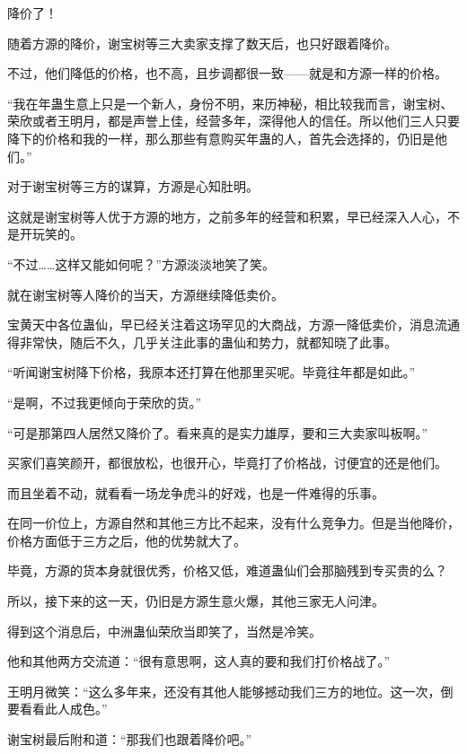 
\begin{this_body}



降价了！

随着方源的降价，谢宝树等三大卖家支撑了数天后，也只好跟着降价。

不过，他们降低的价格，也不高，且步调都很一致——就是和方源一样的价格。

“我在年蛊生意上只是一个新人，身份不明，来历神秘，相比较我而言，谢宝树、荣欣或者王明月，都是声誉上佳，经营多年，深得他人的信任。所以他们三人只要降下的价格和我的一样，那么那些有意购买年蛊的人，首先会选择的，仍旧是他们。”

对于谢宝树等三方的谋算，方源是心知肚明。

这就是谢宝树等人优于方源的地方，之前多年的经营和积累，早已经深入人心，不是开玩笑的。

“不过……这样又能如何呢？”方源淡淡地笑了笑。

就在谢宝树等人降价的当天，方源继续降低卖价。

宝黄天中各位蛊仙，早已经关注着这场罕见的大商战，方源一降低卖价，消息流通得非常快，随后不久，几乎关注此事的蛊仙和势力，就都知晓了此事。

“听闻谢宝树降下价格，我原本还打算在他那里买呢。毕竟往年都是如此。”

“是啊，不过我更倾向于荣欣的货。”

“可是那第四人居然又降价了。看来真的是实力雄厚，要和三大卖家叫板啊。”

买家们喜笑颜开，都很放松，也很开心，毕竟打了价格战，讨便宜的还是他们。

而且坐着不动，就看看一场龙争虎斗的好戏，也是一件难得的乐事。

在同一价位上，方源自然和其他三方比不起来，没有什么竞争力。但是当他降价，价格方面低于三方之后，他的优势就大了。

毕竟，方源的货本身就很优秀，价格又低，难道蛊仙们会那脑残到专买贵的么？

所以，接下来的这一天，仍旧是方源生意火爆，其他三家无人问津。

得到这个消息后，中洲蛊仙荣欣当即笑了，当然是冷笑。

他和其他两方交流道：“很有意思啊，这人真的要和我们打价格战了。”

王明月微笑：“这么多年来，还没有其他人能够撼动我们三方的地位。这一次，倒要看看此人成色。”

谢宝树最后附和道：“那我们也跟着降价吧。”


\end{this_body}
